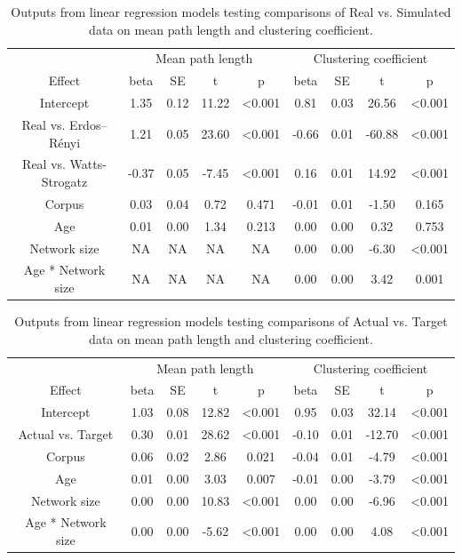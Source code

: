\documentclass[
  man]{apa6}
\begin{document}
\begin{longtable}[t]{ccccccccc}
\caption{\label{tab:table-real-sim}Outputs from linear regression models testing comparisons of Real vs. Simulated data on mean path length and clustering coefficient.}\\
\toprule
\multicolumn{1}{c}{ } & \multicolumn{4}{c}{Mean path length} & \multicolumn{4}{c}{Clustering coefficient} \\
\cmidrule(l{3pt}r{3pt}){2-5} \cmidrule(l{3pt}r{3pt}){6-9}
Effect & beta & SE & t & p & beta & SE & t & p\\
\midrule
Intercept & 1.35 & 0.12 & 11.22 & <0.001 & 0.81 & 0.03 & 26.56 & <0.001\\
Real vs. Erdos–Rényi & 1.21 & 0.05 & 23.60 & <0.001 & -0.66 & 0.01 & -60.88 & <0.001\\
Real vs. Watts-Strogatz & -0.37 & 0.05 & -7.45 & <0.001 & 0.16 & 0.01 & 14.92 & <0.001\\
Corpus & 0.03 & 0.04 & 0.72 & 0.471 & -0.01 & 0.01 & -1.50 & 0.165\\
Age & 0.01 & 0.00 & 1.34 & 0.213 & 0.00 & 0.00 & 0.32 & 0.753\\
\addlinespace
Network size & NA & NA & NA & NA & 0.00 & 0.00 & -6.30 & <0.001\\
Age * Network size & NA & NA & NA & NA & 0.00 & 0.00 & 3.42 & 0.001\\
\bottomrule
\end{longtable}

\begin{longtable}[t]{ccccccccc}
\caption{\label{tab:table-actual-target}Outputs from linear regression models testing comparisons of Actual vs. Target data on mean path length and clustering coefficient.}\\
\toprule
\multicolumn{1}{c}{ } & \multicolumn{4}{c}{Mean path length} & \multicolumn{4}{c}{Clustering coefficient} \\
\cmidrule(l{3pt}r{3pt}){2-5} \cmidrule(l{3pt}r{3pt}){6-9}
Effect & beta & SE & t & p & beta & SE & t & p\\
\midrule
Intercept & 1.03 & 0.08 & 12.82 & <0.001 & 0.95 & 0.03 & 32.14 & <0.001\\
Actual vs. Target & 0.30 & 0.01 & 28.62 & <0.001 & -0.10 & 0.01 & -12.70 & <0.001\\
Corpus & 0.06 & 0.02 & 2.86 & 0.021 & -0.04 & 0.01 & -4.79 & <0.001\\
Age & 0.01 & 0.00 & 3.03 & 0.007 & -0.01 & 0.00 & -3.79 & <0.001\\
Network size & 0.00 & 0.00 & 10.83 & <0.001 & 0.00 & 0.00 & -6.96 & <0.001\\
\addlinespace
Age * Network size & 0.00 & 0.00 & -5.62 & <0.001 & 0.00 & 0.00 & 4.08 & <0.001\\
\bottomrule
\end{longtable}
\end{document}
